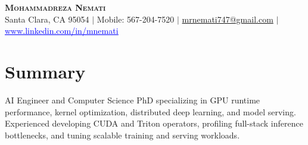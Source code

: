 \documentclass[letterpaper,13pt]{article}
\begin{document}
\begin{center}
    \textbf{\LARGE \scshape Mohammadreza Nemati} \\ \vspace{1pt}
    \small Santa Clara, CA 95054 $|$ Mobile: 567-204-7520 $|$
    \href{mailto:mrnemati747@gmail.com}{mrnemati747@gmail.com} $|$
    \href{https://www.linkedin.com/in/mnemati/}{\textcolor{blue}{\underline{www.linkedin.com/in/mnemati}}}
\end{center}

\section{Summary}
\small{AI Engineer and Computer Science PhD specializing in GPU runtime performance, kernel optimization, distributed deep learning, and model serving. Experienced developing CUDA and Triton operators, profiling full-stack inference bottlenecks, and tuning scalable training and serving workloads.}
\vspace{0.05cm}
\end{document}
